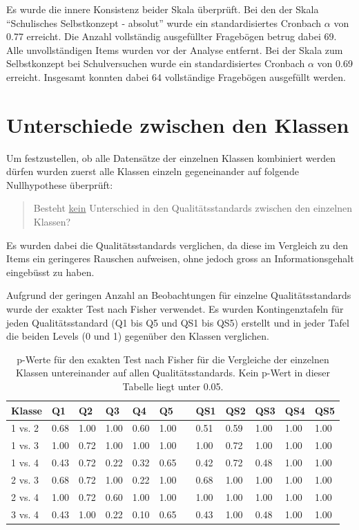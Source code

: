 Es wurde die innere Konsistenz beider Skala überprüft. Bei den der Skala "`Schulisches Selbstkonzept - absolut"' wurde ein standardisiertes Cronbach $\alpha$ von 0.77 erreicht. Die Anzahl vollständig ausgefüllter Fragebögen betrug dabei 69. Alle unvollständigen Items wurden vor der Analyse entfernt. Bei der Skala zum Selbstkonzept bei Schulversuchen wurde ein standardisiertes Cronbach $\alpha$ von 0.69 erreicht. Insgesamt konnten dabei 64 vollständige Fragebögen ausgefüllt werden. 


\section{Unterschiede zwischen den Klassen}

Um festzustellen, ob alle Datensätze der einzelnen Klassen kombiniert werden dürfen wurden zuerst alle Klassen einzeln gegeneinander auf folgende Nullhypothese überprüft: 
\begin{quote}
Besteht \underline{kein} Unterschied in den Qualitätsstandards zwischen den einzelnen Klassen?
\end{quote}
Es wurden dabei die Qualitätsstandards verglichen, da diese im Vergleich zu den Items ein geringeres Rauschen aufweisen, ohne jedoch gross an Informationsgehalt eingebüsst zu haben.


Aufgrund der geringen Anzahl an Beobachtungen für einzelne Qualitätsstandards wurde der exakter Test nach Fisher verwendet. Es wurden Kontingenztafeln für jeden Qualitätsstandard (Q1 bis Q5 und QS1 bis QS5) erstellt und in jeder Tafel die beiden Levels (0 und 1) gegenüber den Klassen verglichen.


\begin{table}[htbp]
  \centering
\begin{tabular}{@{}llllllllllll@{}}
\toprule
 Klasse & Q1 & Q2 & Q3 & Q4 & Q5 && QS1 & QS2 & QS3 & QS4 & QS5 \\ 
\midrule
 1 vs. 2 &   0.68 & 1.00 & 1.00 & 0.60 & 1.00 && 0.51 & 0.59 & 1.00 & 1.00 & 1.00   \\ 
 1 vs. 3 &   1.00 & 0.72 & 1.00 & 1.00 & 1.00 && 1.00 & 0.72 & 1.00 & 1.00 & 1.00   \\
 1 vs. 4 &   0.43 & 0.72 & 0.22 & 0.32 & 0.65 && 0.42 & 0.72 & 0.48 & 1.00 & 1.00   \\
 2 vs. 3 &   0.68 & 0.72 & 1.00 & 0.22 & 1.00 && 0.68 & 1.00 & 1.00 & 1.00 & 1.00   \\
 2 vs. 4 &   1.00 & 0.72 & 0.60 & 1.00 & 1.00 && 1.00 & 1.00 & 1.00 & 1.00 & 1.00   \\
 3 vs. 4 &   0.43 & 1.00 & 0.22 & 0.10 & 0.65 && 0.43 & 1.00 & 0.48 & 1.00 & 1.00   \\
\bottomrule
\end{tabular} 
  \caption{p-Werte für den exakten Test nach Fisher für die Vergleiche der einzelnen Klassen untereinander auf allen Qualitätsstandards. Kein p-Wert in dieser Tabelle liegt unter 0.05. }
  \label{tab:KlassenVergleiche}
\end{table}


